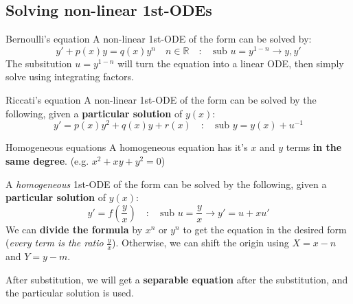 \subsection{Solving non-linear 1st-ODEs}
\begin{definition}
    {Bernoulli's equation}
    A non-linear 1st-ODE of the form can be solved by:
    \[y'+p(x)y=q(x)y^n\quad n\in\mathds{R}\quad : \quad \text{sub }u=y^{1-n}\to y,y'\]
    The subsitution $u=y^{1-n}$ will turn the equation into a linear ODE, then simply solve using integrating factors.
\end{definition}
\begin{definition}
    {Riccati's equation}
    A non-linear 1st-ODE of the form can be solved by the following, given a \textbf{particular solution} of $y(x)$:
    \[y'=p(x)y^2+q(x)y+r(x)\quad : \quad \text{sub }y=y(x) + u^{-1}\]
\end{definition}
\begin{definition}
    {Homogeneous equations}
    A homogeneous equation has it's $x$ and $y$ terms \textbf{in the same degree}. (e.g. $x^2+xy+y^2=0$)

    A \emph{homogeneous} 1st-ODE of the form can be solved by the following, given a \textbf{particular solution} of $y(x)$:
    \[y'=f(\frac{y}{x})\quad : \quad \text{sub }u=\frac{y}{x} \to y'=u + xu'\]
    We can \textbf{divide the formula} by $x^n$ or $y^n$ to get the equation in the desired form (\emph{every term is the ratio} $\frac{y}{x}$). Otherwise, we can shift the origin using $X=x-n$ and $Y=y-m$.

    After substitution, we will get a \textbf{separable equation} after the substitution, and the particular solution is used.
\end{definition}

